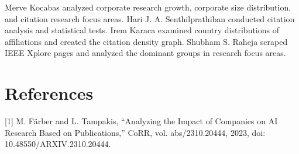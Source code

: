 \documentclass{article}
\begin{document}
Merve Kocabas analyzed corporate research growth, corporate size distribution, and citation research focus areas. Hari J. A. Senthilprathiban conducted citation analysis and statistical tests. Irem Karaca examined country distributions of affiliations and created the citation density graph. Shubham S. Raheja scraped IEEE Xplore pages and analyzed the dominant groups in research focus areas.




\newpage
\section*{References}

[1] M. Färber and L. Tampakis, “Analyzing the Impact of Companies on AI Research Based on Publications,” CoRR, vol. abs/2310.20444, 2023, doi: 10.48550/ARXIV.2310.20444.
\end{document}
